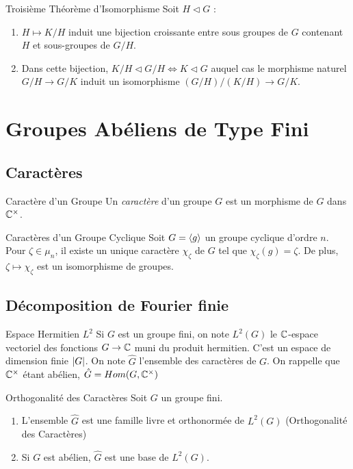 \documentclass{cours}
\begin{document}
\begin{propositionfr}{Troisième Théorème d'Isomorphisme}{}
    Soit $H \lhd G$ :
    \begin{enumerate}
        \item $H \mapsto K/H$ induit une bijection croissante entre sous groupes de $G$ contenant $H$ et sous-groupes de $G/H$.
        \item Dans cette bijection, $K/H \lhd G/H \Leftrightarrow K \lhd G$ auquel cas le morphisme naturel $G/H \rightarrow G/K$ induit un isomorphisme $\left(G/H\right)/\left(K/H\right) \rightarrow G/K$.
    \end{enumerate}
\end{propositionfr}

\newpage
\section{Groupes Abéliens de Type Fini}
\subsection{Caractères}
\begin{définition}{Caractère d'un Groupe}{}
    Un \emph{caractère} d'un groupe $G$ est un morphisme de $G$ dans $\mathbb{C}^{\times}$.
\end{définition}

\begin{propositionfr}{Caractères d'un Groupe Cyclique}{}
    Soit $G = \left\langle g \right\rangle$ un groupe cyclique d'ordre $n$. Pour $\zeta \in \mu_{n}$, il existe un unique caractère $\chi_{\zeta}$ de $G$ tel que $\chi_{\zeta}(g) = \zeta$. De plus, $\zeta \mapsto \chi_{\zeta}$ est un isomorphisme de groupes.
\end{propositionfr}

\subsection{Décomposition de Fourier finie}
\begin{définition}{Espace Hermitien $L^{2}$}{}
    Si $G$ est un groupe fini, on note $L^{2}(G)$ le $\mathbb{C}$-espace vectoriel des fonctions $G \rightarrow \mathbb{C}$ muni du produit hermitien. 
    C'est un espace de dimension finie $\left|G\right|$. On note $\hat{G}$ l'ensemble des caractères de $G$. On rappelle que $\mathbb{C}^{\times}$ étant abélien, $\hat{G} = Hom(G, \mathbb{C}^{\times})$
\end{définition}

\begin{théorème}{Orthogonalité des Caractères}{}
    Soit $G$ un groupe fini.
    \begin{enumerate}
        \item L'ensemble $\hat{G}$ est une famille livre et orthonormée de $L^{2}(G)$ (Orthogonalité des Caractères)
        \item Si $G$ est abélien, $\hat{G}$ est une base de $L^{2}(G)$.
    \end{enumerate}
\end{théorème}
\end{document}
